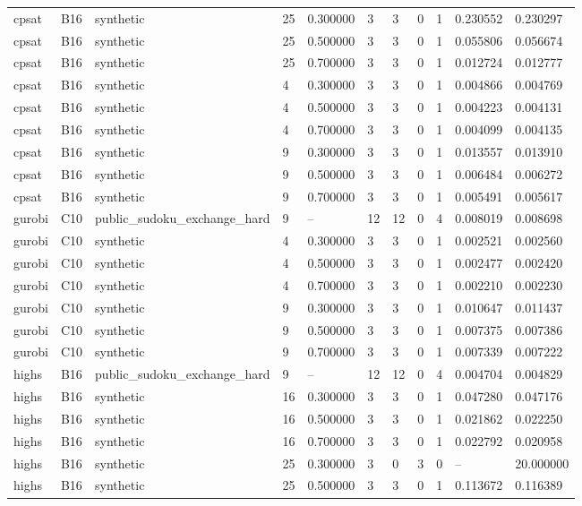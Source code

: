 \begin{tabular}{lllllllllll}
cpsat & B16 & synthetic & 25 & 0.300000 & 3 & 3 & 0 & 1 & 0.230552 & 0.230297 \\
cpsat & B16 & synthetic & 25 & 0.500000 & 3 & 3 & 0 & 1 & 0.055806 & 0.056674 \\
cpsat & B16 & synthetic & 25 & 0.700000 & 3 & 3 & 0 & 1 & 0.012724 & 0.012777 \\
cpsat & B16 & synthetic & 4 & 0.300000 & 3 & 3 & 0 & 1 & 0.004866 & 0.004769 \\
cpsat & B16 & synthetic & 4 & 0.500000 & 3 & 3 & 0 & 1 & 0.004223 & 0.004131 \\
cpsat & B16 & synthetic & 4 & 0.700000 & 3 & 3 & 0 & 1 & 0.004099 & 0.004135 \\
cpsat & B16 & synthetic & 9 & 0.300000 & 3 & 3 & 0 & 1 & 0.013557 & 0.013910 \\
cpsat & B16 & synthetic & 9 & 0.500000 & 3 & 3 & 0 & 1 & 0.006484 & 0.006272 \\
cpsat & B16 & synthetic & 9 & 0.700000 & 3 & 3 & 0 & 1 & 0.005491 & 0.005617 \\
gurobi & C10 & public\_sudoku\_exchange\_hard & 9 & -- & 12 & 12 & 0 & 4 & 0.008019 & 0.008698 \\
gurobi & C10 & synthetic & 4 & 0.300000 & 3 & 3 & 0 & 1 & 0.002521 & 0.002560 \\
gurobi & C10 & synthetic & 4 & 0.500000 & 3 & 3 & 0 & 1 & 0.002477 & 0.002420 \\
gurobi & C10 & synthetic & 4 & 0.700000 & 3 & 3 & 0 & 1 & 0.002210 & 0.002230 \\
gurobi & C10 & synthetic & 9 & 0.300000 & 3 & 3 & 0 & 1 & 0.010647 & 0.011437 \\
gurobi & C10 & synthetic & 9 & 0.500000 & 3 & 3 & 0 & 1 & 0.007375 & 0.007386 \\
gurobi & C10 & synthetic & 9 & 0.700000 & 3 & 3 & 0 & 1 & 0.007339 & 0.007222 \\
highs & B16 & public\_sudoku\_exchange\_hard & 9 & -- & 12 & 12 & 0 & 4 & 0.004704 & 0.004829 \\
highs & B16 & synthetic & 16 & 0.300000 & 3 & 3 & 0 & 1 & 0.047280 & 0.047176 \\
highs & B16 & synthetic & 16 & 0.500000 & 3 & 3 & 0 & 1 & 0.021862 & 0.022250 \\
highs & B16 & synthetic & 16 & 0.700000 & 3 & 3 & 0 & 1 & 0.022792 & 0.020958 \\
highs & B16 & synthetic & 25 & 0.300000 & 3 & 0 & 3 & 0 & -- & 20.000000 \\
highs & B16 & synthetic & 25 & 0.500000 & 3 & 3 & 0 & 1 & 0.113672 & 0.116389 \\

\end{tabular}
